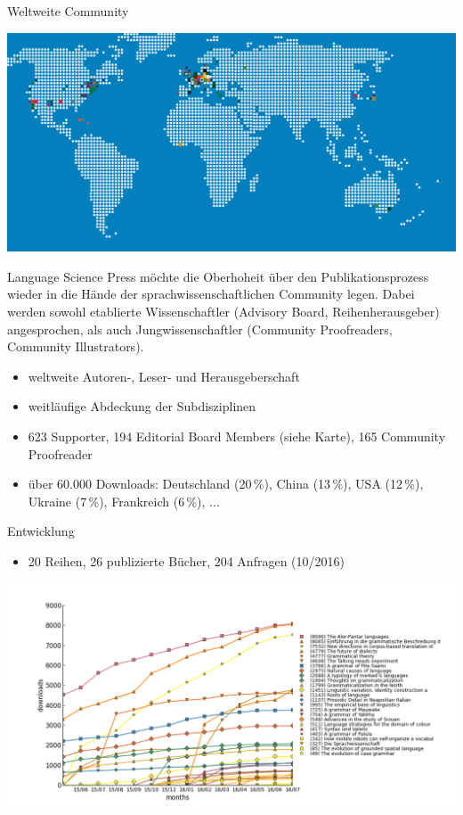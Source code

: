 \documentclass[final,utf8]{beamer}
\begin{document}
\begin{frame}{}
\begin{columns}[t]
\begin{column}{.45\linewidth}
    \begin{block}{Weltweite Community} 
	\parbox{.9\textwidth}{
\includegraphics[width=.9\textwidth]{WORLDMAPDOTSdots.png}


Language Science Press m\"ochte die Oberhoheit \"uber den Publikationsprozess wieder in die H\"ande der sprachwissenschaftlichen Community legen. Dabei werden sowohl etablierte Wissenschaftler (Advisory Board, Reihenherausgeber) angesprochen, als auch Jungwissenschaftler (Community Proofreaders, Community Illustrators).  

	\begin{itemize} 
	    \item weltweite Autoren-, Leser- und Herausgeberschaft
	    \item weitl\"aufige Abdeckung der Subdisziplinen
	    \item 623 Supporter, 194 Editorial Board Members (siehe Karte), 165 Community Proofreader
	    \item \"uber 60.000 Downloads: Deutschland (20\,\%), China (13\,\%), USA (12\,\%), Ukraine (7\,\%), Frankreich (6\,\%), ...
	\end{itemize}  
}
    \end{block} 

    \begin{block}{Entwicklung}
	  \begin{itemize}
		      \item 20 Reihen, 26 publizierte B\"ucher, 204 Anfragen (10/2016)
	  \end{itemize} 
      \includegraphics[width=.9\textwidth]{cumulativeall.png}
    \end{block}  
  


\end{column}
\end{columns}
\end{frame}
\end{document}

